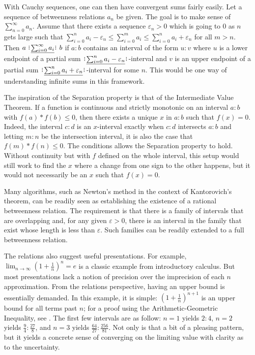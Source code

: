 \documentclass[12pt]{article}
\begin{document}
With Cauchy sequences, one can then have convergent sums fairly easily. Let a sequence of betweenness relations $a_n$ be given. The goal is to make sense of $\sum_{n=0}^{\infty} a_n$. Assume that there exists a sequence $\varepsilon_n > 0$ which is going to 0 as $n$ gets large such that $\sum_{i=0}^n a_i - \varepsilon_n \leq \sum_{i=0}^m a_i \leq \sum_{i=0}^n a_i+ \varepsilon_n$ for all $m > n$. Then  $a \xrel[\sum_{i=0}^{\infty} a_i] b$ if $a:b$ contains an interval of the form $u:v$ where $u$ is a lower endpoint of a partial sum $\xrel[\sum_{i=0}^n a_i - \varepsilon_n ]$-interval and $v$ is an upper endpoint of a partial sum $\xrel[\sum_{i=0}^n a_i + \varepsilon_n ]$-interval for some $n$. This would be one way of understanding infinite sums in this framework. 

The inspiration of the Separation property is that of the Intermediate Value Theorem. If a function is continuous and strictly monotonic on an interval $a:b$ with $f(a)*f(b) \leq 0$, then there exists a unique $x$ in $a:b$ such that $f(x) = 0$. Indeed, the interval $c:d$ is an $x$-interval exactly when $c:d$ intersects $a:b$ and letting $m:n$ be the intersection interval, it is also the case that $f(m)*f(n) \leq 0$. The conditions allows the Separation property to hold. Without continuity but with $f$ defined on the whole interval, this setup would still work to find the $x$ where a change from one sign to the other  happens, but it would not necessarily be an $x$ such that $f(x) = 0$.

Many algorithms, such as Newton's method in the context of Kantorovich's theorem, can be readily seen as establishing the existence of a rational betweenness relation. The requirement is that there is a family of intervals that are overlapping and, for any given $\varepsilon >0$, there is an interval in the family that exist whose length is less than $\varepsilon$. Such families can be readily extended to a full betweenness relation. 

The relations also suggest useful presentations. For example, $\lim_{n \to \infty} (1+\frac{1}{n})^n = e$ is a classic example from introductory calculus. But most presentations lack a notion of precision over the imprecision of each $n$ approximation. From the relations perspective, having an upper bound is essentially demanded. In this example, it is simple: $(1 + \frac{1}{n})^{n+1}$ is an upper bound for all terms past $n$; for a proof using the Arithmetic-Geometric Inequality, see \cite{mend}. The first few intervals are as follow: $n=1$ yields $2:4$, $n=2$ yields $\frac{9}{4}:\frac{27}{8}$, and $n=3$ yields $\frac{64}{27}:\frac{256}{81}$. Not only is that a bit of a pleasing pattern, but it yields a concrete sense of converging on the limiting  value with clarity as to the uncertainty. 
\end{document}
